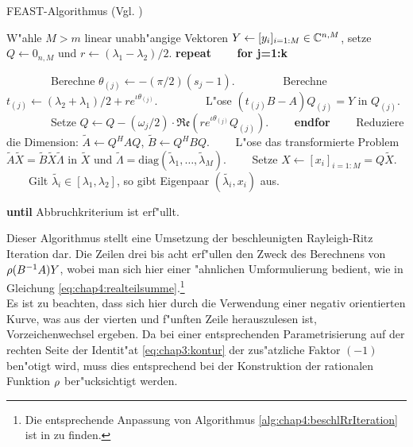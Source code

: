\begin{algorithm}
\caption{FEAST-Algorithmus (Vgl. \cite[Abschnitt III]{polizzi})}\label{alg:chap4:feast}
\begin{algorithmic}[1]
\State W"ahle $M > m$ linear unabh"angige Vektoren $Y \gets [y_i]_{i=1:M} \in\mathbb{C}^{n,M}$, setze $Q\gets 0_{n,M}$ und $r\gets (\lambda_1 - \lambda_2)/2$.
\State \textbf{repeat}
\State \ \ \ \ \textbf{for j=1:k}

\State \ \ \ \ \ \ \ \ Berechne $\theta_{(j)} \gets -(\pi/2)(s_j-1)$.
\State \ \ \ \ \ \ \ \ Berechne $t_{(j)} \gets (\lambda_2 + \lambda_1)/2 + re^{\iota\theta_{(j)}}$.
\State \ \ \ \ \ \ \ \ L"ose $(t_{(j)} B-A)Q_{(j)} = Y$ in $Q_{(j)}$.
\State \ \ \ \ \ \ \ \ Setze $Q\gets Q - (\omega_j/2)\cdot\mathfrak{Re}\left(re^{\iota \theta_{(j)}} Q_{(j)}\right)$.
\State \ \ \ \ \textbf{endfor}
\State \ \ \ \ Reduziere die Dimension: $\widetilde{A} \gets Q^H A Q$,
$\widetilde{B} \gets Q^H B Q$.
\State \ \ \ \ L"ose das transformierte Problem $\widetilde{A}\widetilde{X}
= \widetilde{B}\widetilde{X}\widetilde{\Lambda}$ in
$\widetilde{X}$ und $\widetilde{\Lambda} = \text{diag}(\widetilde{\lambda}_1,\ldots,\widetilde{\lambda}_M)$.
\State \ \ \ \ Setze $X \gets [x_i]_{i=1:M} = Q\widetilde{X}$.
\State \ \ \ \ Gilt $\widetilde{\lambda_i} \in [\lambda_1,\lambda_2]$, so gibt Eigenpaar $(\widetilde{\lambda_i},x_i)$ aus.

\State \textbf{until} Abbruchkriterium ist erf"ullt.
\end{algorithmic}
\end{algorithm}

Dieser Algorithmus stellt eine Umsetzung der beschleunigten Rayleigh-Ritz Iteration dar. Die Zeilen drei bis acht erf"ullen den Zweck des Berechnens von $\rho(B^{-1}A)Y$, wobei man sich hier einer "ahnlichen Umformulierung bedient, wie in Gleichung \eqref{eq:chap4:realteilsumme}.\footnote{Die entsprechende Anpassung von Algorithmus \ref{alg:chap4:beschlRrIteration} ist in \cite[365]{ptep} zu finden.}\\

Es ist zu beachten, dass sich hier durch die Verwendung einer negativ orientierten Kurve, was aus der vierten und f"unften Zeile herauszulesen ist, Vorzeichenwechsel ergeben. Da bei einer entsprechenden Parametrisierung auf der rechten Seite der Identit"at \eqref{eq:chap3:kontur} der zus"atzliche Faktor $(-1)$ ben"otigt wird, muss dies entsprechend bei der Konstruktion der rationalen Funktion $\rho$ ber"ucksichtigt werden.\\

